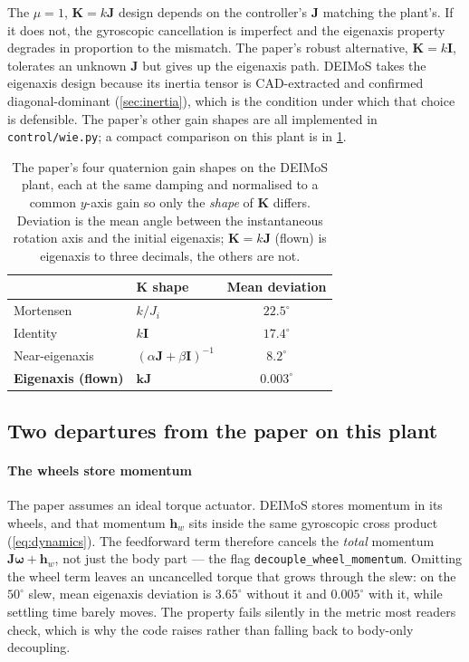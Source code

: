 \documentclass[conference,10pt,a4paper]{IEEEtran}
\newcommand{\vect}[1]{\bm{#1}}
\newcommand{\mat}[1]{\bm{#1}}
\begin{document}
The $\mu=1$, $\mat{K}=k\mat{J}$ design depends on the controller's $\mat{J}$
matching the plant's. If it does not, the gyroscopic cancellation is
imperfect and the eigenaxis property degrades in proportion to the mismatch.
The paper's robust alternative, $\mat{K}=k\mat{I}$, tolerates an unknown
$\mat{J}$ but gives up the eigenaxis path. DEIMoS takes the eigenaxis design
because its inertia tensor is CAD-extracted and confirmed diagonal-dominant
(\cref{sec:inertia}), which is the condition under which that choice is
defensible. The paper's other gain shapes are all implemented in
\texttt{control/wie.py}; a compact comparison on this plant is in
\cref{tab:fourcases}.

\begin{table}[!t]
\centering
\caption{The paper's four quaternion gain shapes on the DEIMoS plant, each at
the same damping and normalised to a common $y$-axis gain so only the
\emph{shape} of $\mat{K}$ differs. Deviation is the mean angle between the
instantaneous rotation axis and the initial eigenaxis; $\mat{K}=k\mat{J}$
(flown) is eigenaxis to three decimals, the others are not.}
\label{tab:fourcases}
\footnotesize
\begin{tabular}{@{}llc@{}}
\toprule
& $\mat{K}$ shape & Mean deviation \\
\midrule
Mortensen        & $k/J_i$                       & $22.5^\circ$ \\
Identity         & $k\mat{I}$                    & $17.4^\circ$ \\
Near-eigenaxis   & $(\alpha\mat{J}+\beta\mat{I})^{-1}$ & $8.2^\circ$ \\
\textbf{Eigenaxis (flown)} & $\mathbf{k}\mat{J}$     & $\mathbf{0.003}^\circ$ \\
\bottomrule
\end{tabular}
\end{table}

\subsection{Two departures from the paper on this plant}
\label{sec:departures}

\paragraph{The wheels store momentum}
The paper assumes an ideal torque actuator. DEIMoS stores momentum in its
wheels, and that momentum $\vect{h}_w$ sits inside the same gyroscopic cross
product (\cref{eq:dynamics}). The feedforward term therefore cancels the
\emph{total} momentum $\mat{J}\vect{\omega}+\vect{h}_w$, not just the body
part --- the flag \texttt{decouple\_wheel\_momentum}. Omitting the wheel term
leaves an uncancelled torque that grows through the slew: on the $50^\circ$
slew, mean eigenaxis deviation is $3.65^\circ$ without it and $0.005^\circ$
with it, while settling time barely moves. The property fails silently in the
metric most readers check, which is why the code raises rather than falling
back to body-only decoupling.
\end{document}
